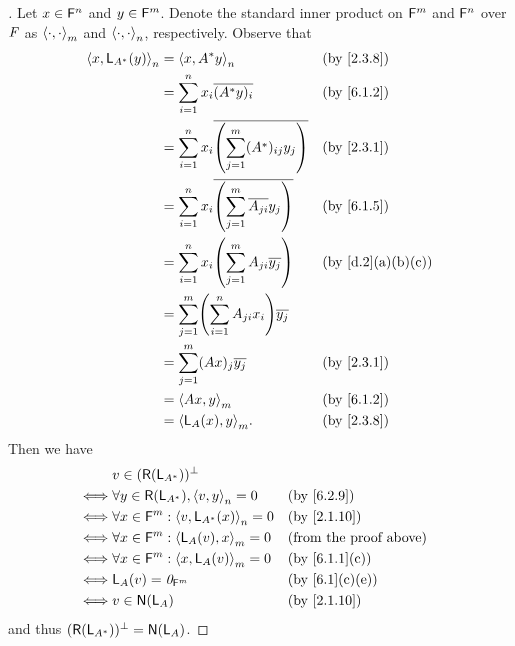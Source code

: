 \begin{proof}[]
  Let \(x \in \mathsf{F}^n\) and \(y \in \mathsf{F}^m\).
  Denote the standard inner product on \(\mathsf{F}^m\) and \(\mathsf{F}^n\) over \(\mathit{F}\) as \(\left\langle\cdot, \cdot\right\rangle_m\) and \(\left\langle\cdot, \cdot\right\rangle_n\), respectively.
  Observe that
  \begin{align*}
    \inn{x, \L_{A^*}(y)}_n & = \inn{x, A^* y}_n                                                 &  & \text{(by \cref{2.3.8})}        \\
                           & = \sum_{i = 1}^n x_i \conj{(A^* y)_i}                              &  & \text{(by \cref{6.1.2})}        \\
                           & = \sum_{i = 1}^n x_i \conj{\pa{\sum_{j = 1}^m (A^*)_{i j} y_j}}    &  & \text{(by \cref{2.3.1})}        \\
                           & = \sum_{i = 1}^n x_i \conj{\pa{\sum_{j = 1}^m \conj{A_{j i}} y_j}} &  & \text{(by \cref{6.1.5})}        \\
                           & = \sum_{i = 1}^n x_i \pa{\sum_{j = 1}^m A_{j i} \conj{y_j}}        &  & \text{(by \cref{d.2}(a)(b)(c))} \\
                           & = \sum_{j = 1}^m \pa{\sum_{i = 1}^n A_{j i} x_i} \conj{y_j}                                             \\
                           & = \sum_{j = 1}^m (Ax)_j \conj{y_j}                                 &  & \text{(by \cref{2.3.1})}        \\
                           & = \inn{Ax, y}_m                                                    &  & \text{(by \cref{6.1.2})}        \\
                           & = \inn{\L_A(x), y}_m.                                              &  & \text{(by \cref{2.3.8})}
  \end{align*}
  Then we have
  \begin{align*}
         & v \in (\rg{\L_{A^*}})^{\perp}                                                          \\
    \iff & \forall y \in \rg{\L_{A^*}}, \inn{v, y}_n = 0       &  & \text{(by \cref{6.2.9})}      \\
    \iff & \forall x \in \vs{F}^m : \inn{v, \L_{A^*}(x)}_n = 0 &  & \text{(by \cref{2.1.10})}     \\
    \iff & \forall x \in \vs{F}^m : \inn{\L_A(v), x}_m = 0     &  & \text{(from the proof above)} \\
    \iff & \forall x \in \vs{F}^m : \inn{x, \L_A(v)}_m = 0     &  & \text{(by \cref{6.1.1}(c))}   \\
    \iff & \L_A(v) = \zv_{\vs{F}^m}                            &  & \text{(by \cref{6.1}(c)(e))}  \\
    \iff & v \in \ns{\L_A}                                     &  & \text{(by \cref{2.1.10})}
  \end{align*}
  and thus \((\rg{\L_{A^*}})^{\perp} = \ns{\L_A}\).
\end{proof}

